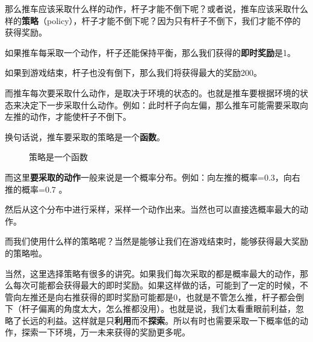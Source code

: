 \documentclass[lang=cn,newtx,10pt,scheme=chinese]{elegantbook}
\begin{document}
那么推车应该采取什么样的动作，杆子才能不倒下呢？或者说，推车应该采取什么样的\textbf{策略}（policy），杆子才能不倒下呢？因为只有杆子不倒下，我们才能不停的获得奖励。

如果推车每采取一个动作，杆子还能保持平衡，那么我们获得的\textbf{即时奖励}是1。

如果到游戏结束，杆子也没有倒下，那么我们将获得最大的奖励200。

而推车每次要采取什么动作，是取决于环境的状态的。也就是推车要根据环境的状态来决定下一步采取什么动作。例如：此时杆子向左偏，那么推车可能需要采取向左推的动作，才能使杆子不倒下。

换句话说，推车要采取的策略是一个\textbf{函数}。

\begin{figure}[!ht]
\centering
{}%
\caption{策略是一个函数}
\label{fig:fig-policy-function}
\end{figure}

而这里\textbf{要采取的动作}一般来说是一个概率分布。例如：向左推的概率=0.3，向右推的概率=0.7 。

然后从这个分布中进行采样，采样一个动作出来。当然也可以直接选概率最大的动作。

而我们使用什么样的策略呢？当然是能够让我们在游戏结束时，能够获得最大奖励的策略啦。

当然，这里选择策略有很多的讲究。如果我们每次采取的都是概率最大的动作，那么每次可能都会获得最大的即时奖励。如果这样做的话，可能到了一定的时候，不管向左推还是向右推获得的即时奖励可能都是0，也就是不管怎么推，杆子都会倒下（杆子偏离的角度太大，怎么推都没用）。也就是说，我们太看重眼前利益，忽略了长远的利益。这样就是只\textbf{利用}而不\textbf{探索}。所以有时也需要采取一下概率低的动作，探索一下环境，万一未来获得的奖励更多呢。
\end{document}
